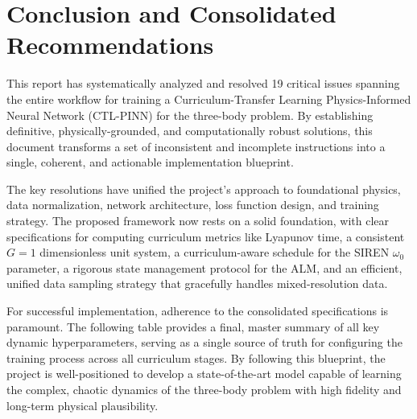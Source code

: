 \documentclass[11pt, a4paper]{article}
\begin{document}
\section*{Conclusion and Consolidated Recommendations}
This report has systematically analyzed and resolved 19 critical issues spanning the entire workflow for training a Curriculum-Transfer Learning Physics-Informed Neural Network (CTL-PINN) for the three-body problem. By establishing definitive, physically-grounded, and computationally robust solutions, this document transforms a set of inconsistent and incomplete instructions into a single, coherent, and actionable implementation blueprint.

The key resolutions have unified the project's approach to foundational physics, data normalization, network architecture, loss function design, and training strategy. The proposed framework now rests on a solid foundation, with clear specifications for computing curriculum metrics like Lyapunov time, a consistent $G=1$ dimensionless unit system, a curriculum-aware schedule for the SIREN $\omega_0$ parameter, a rigorous state management protocol for the ALM, and an efficient, unified data sampling strategy that gracefully handles mixed-resolution data.

For successful implementation, adherence to the consolidated specifications is paramount. The following table provides a final, master summary of all key dynamic hyperparameters, serving as a single source of truth for configuring the training process across all curriculum stages. By following this blueprint, the project is well-positioned to develop a state-of-the-art model capable of learning the complex, chaotic dynamics of the three-body problem with high fidelity and long-term physical plausibility.
\end{document}
